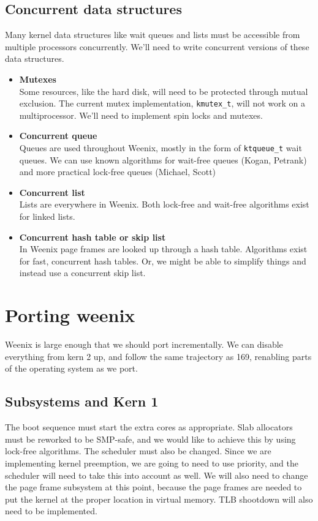 \documentclass{article}
\begin{document}
\subsection{Concurrent data structures}

Many kernel data structures like wait queues and lists must be accessible from multiple
processors concurrently. We'll need to write concurrent versions of these data structures.

\begin{itemize}
    \item \textbf{Mutexes}\\
    Some resources, like the hard disk, will need to be protected through mutual exclusion. The current mutex
    implementation, {\tt{kmutex\_t}}, will not work on a multiprocessor. We'll need to implement
    spin locks and mutexes.
    \item \textbf{Concurrent queue}\\
    Queues are used throughout Weenix, mostly in the form of {\tt{ktqueue\_t}} wait queues. We can
    use known algorithms for wait-free queues (Kogan, Petrank) and more practical lock-free queues (Michael, Scott) 
    \item \textbf{Concurrent list}\\
    Lists are everywhere in Weenix. Both lock-free and wait-free algorithms exist for linked lists.
    \item \textbf{Concurrent hash table or skip list}\\
    In Weenix page frames are looked up through a hash table. Algorithms exist for fast, concurrent hash tables. Or,
    we might be able to simplify things and instead use a concurrent skip list.
\end{itemize}

\section{Porting weenix}

Weenix is large enough that we should port incrementally. We can disable everything from kern 2 up, and follow the same
trajectory as 169, renabling parts of the operating system as we port.

\subsection{Subsystems and Kern 1}

The boot sequence must start the extra cores as appropriate. Slab allocators must be reworked to be SMP-safe,
and we would like to achieve this by using lock-free algorithms. The scheduler must also be changed. Since we
are implementing kernel preemption, we are going to need to use priority, and the scheduler will need to take
this into account as well. We will also need to change the page frame subsystem at this point, because
the page frames are needed to put the kernel at the proper location in virtual memory. TLB shootdown will also
need to be implemented.
\end{document}
